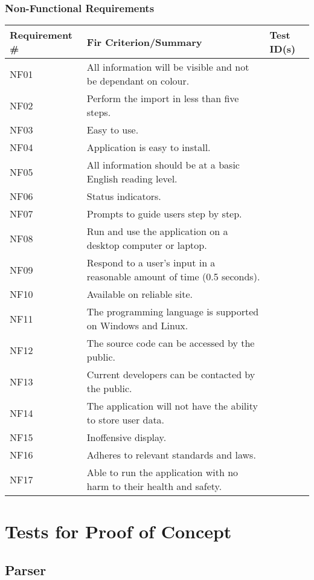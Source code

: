 \documentclass[12pt, titlepage]{article}
\begin{document}
\subsubsection{Non-Functional Requirements}
\begin{tabularx}{\textwidth}{p{3cm}X}
\toprule
\textbf{Requirement #} & \textbf{Fir Criterion/Summary} &
\textbf{Test ID(s)}\\
\midrule
NF01 & All information will be visible and not be dependant on colour.  & \\
NF02 & Perform the import in less than ﬁve steps. & \\
NF03 & Easy to use. & \\
NF04 & Application is easy to install. & \\
NF05 & All information should be at a basic English reading level.  & \\
NF06 & Status indicators. & \\
NF07 & Prompts to guide users step by step. & \\
NF08 & Run and use the application on a desktop computer or laptop.  & \\
NF09 & Respond to a user’s input in a reasonable amount of time (0.5 seconds). & \\
NF10 & Available on reliable site. & \\
NF11 & The programming language is supported on Windows and Linux.  & \\
NF12 & The source code can be accessed by the public.  & \\
NF13 & Current developers can be contacted by the public.  & \\
NF14 & The application will not have the ability to store user data. & \\
NF15 & Inoffensive display. & \\
NF16 & Adheres to relevant standards and laws. & \\
NF17 & Able to run the application with no harm to their health and safety.  & \\

\bottomrule
\end{tabularx}

\section{Tests for Proof of Concept}

\subsection{Parser}
		
\end{document}
